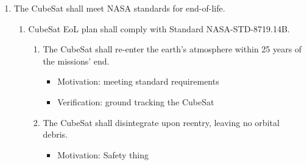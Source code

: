 \begin{enumerate}
\begin{enumerate}
\begin{enumerate}
                \begin{itemize}
                    \item Motivation: Orientation with the magnetic field is required by scientific payload and pointing accuracy gives margin of error from current state-of-the-art GNC systems which can produce point accuracy of better than 0.2° 
                    \item Verification: Engaging GNC system in vacuum chamber test facility. 
                \end{itemize}
            \item The CubeSat shall be able to receive information from the ground station at a minimum rate of 2 kb/s.
                \begin{itemize}
                    \item Motivation: Ability to retrieve scientific data during operation and allow for less computational resources required to store data onboard. 
                    \item Verification: Communications system turned on and sample data packets sent from the CubeSat at a separate location to the ground station with decoding software showing the expected data.  
                \end{itemize}
        \end{enumerate}
    \end{enumerate} %
    \item The CubeSat shall meet NASA standards for end-of-life.
    \begin{enumerate}
        \item CubeSat EoL plan shall comply with Standard NASA-STD-8719.14B. 
        \begin{enumerate}
            \item The CubeSat shall re-enter the earth’s atmosphere within 25 years of the missions’ end. 
               \begin{itemize}
                    \item Motivation: meeting standard requirements
                    \item Verification: ground tracking the CubeSat
                \end{itemize}
            \item The CubeSat shall disintegrate upon reentry, leaving no orbital debris. 
                \begin{itemize}
                    \item Motivation: Safety thing

\end{itemize}
\end{enumerate}
\end{enumerate}
\end{enumerate}
